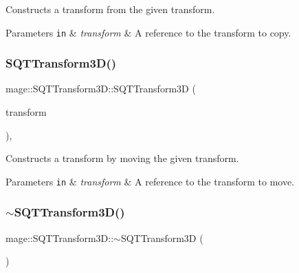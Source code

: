 Constructs a transform from the given transform.


\begin{DoxyParams}[1]{Parameters}
\mbox{\tt in}  & {\em transform} & A reference to the transform to copy. \\
\hline
\end{DoxyParams}
\mbox{\label{classmage_1_1_s_q_t_transform3_d_a0bef0194d9b744c1a9a1cb663ff72125}} 
\subsubsection{\texorpdfstring{S\+Q\+T\+Transform3\+D()}{SQTTransform3D()}\hspace{0.1cm}{\footnotesize\ttfamily [5/5]}}
{\footnotesize\ttfamily mage\+::\+S\+Q\+T\+Transform3\+D\+::\+S\+Q\+T\+Transform3D (\begin{DoxyParamCaption}\item[{\mbox{\hyperlink{classmage_1_1_s_q_t_transform3_d}{S\+Q\+T\+Transform3D}} \&\&}]{transform }\end{DoxyParamCaption})\hspace{0.3cm}{\ttfamily [default]}, {\ttfamily [noexcept]}}

Constructs a transform by moving the given transform.


\begin{DoxyParams}[1]{Parameters}
\mbox{\tt in}  & {\em transform} & A reference to the transform to move. \\
\hline
\end{DoxyParams}
\mbox{\label{classmage_1_1_s_q_t_transform3_d_a12a230a7be99b854088c2f98bf18526b}} 
\subsubsection{\texorpdfstring{$\sim$\+S\+Q\+T\+Transform3\+D()}{~SQTTransform3D()}}
{\footnotesize\ttfamily mage\+::\+S\+Q\+T\+Transform3\+D\+::$\sim$\+S\+Q\+T\+Transform3D (\begin{DoxyParamCaption}{ }\end{DoxyParamCaption})\hspace{0.3cm}{\ttfamily [default]}}

